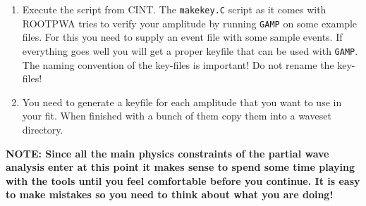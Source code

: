 \documentclass[12pt,a4paper]{article}
\begin{document}
{\begin{enumerate}
\begin{lstlisting}
  // Define Isobar states and their decays
  // each of these objects corresponds to one node
  // in an isobar decay tree
  
  //              name   iso1 iso2 l
  partkey sigma1("sigma",&p1,&p2,0);
  partkey rho1("rho(770)",&p3,&p4,1);
  partkey pi13("pi(1300)",&p5,&rho1,1);

  // define quantum numbers of resonance X 
  // and its decay into the first isobar pair
  int l=2;  // angular momentum 
  int s=0;  // spin

  int j=2;  // total spin of X
  int m=0;  // spin projection
  int eps=1; // reflectivity
  int p=-1; // parity

  // the isobar decay of X
  partkey X("X",&sigma1,&pi13,l,s);

  // final partial wave with all quantum numbers
  wavekey mykey(j,p,m,eps,&X);

  // write the key-file:
  mykey.write();
\end{lstlisting}

\item Execute the script from CINT. The {\tt makekey.C} script as it comes with ROOTPWA tries to verify your amplitude by running {\tt GAMP} on some example files. For this you need to supply an event file with some sample events. If everything goes well you will get a proper keyfile that can be used with {\tt GAMP}. The naming convention of the key-files is important! Do not rename the key-files!
\item You need to generate a keyfile for each amplitude that you want to use in your fit. When finished with a bunch of them copy them into a waveset directory. \end{enumerate}

{\bfseries NOTE: Since all the main physics constraints of the partial wave analysis enter at this point it makes sense to spend some time playing with the tools until you feel comfortable before you continue. It is easy to make mistakes so you need to think about what you are doing!}


}
\end{document}
